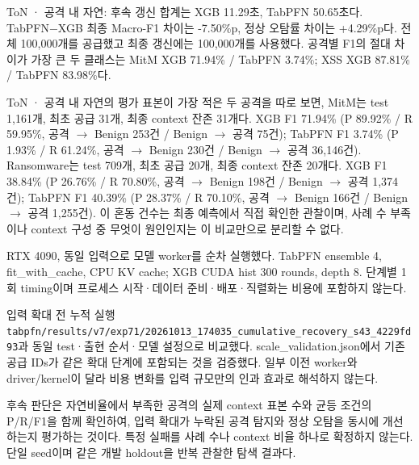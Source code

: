ToN · 공격 내 자연: 후속 갱신 합계는 XGB 11.29초, TabPFN 50.65초다. TabPFN−XGB 최종 Macro-F1 차이는 -7.50\%p, 정상 오탐률 차이는 +\allowbreak{}4.29\%p다. 전체 100,000개를 공급했고 최종 갱신에는 100,000개를 사용했다. 공격별 F1의 절대 차이가 가장 큰 두 클래스는 MitM XGB 71.94\% /\allowbreak{} TabPFN 3.74\%; XSS XGB 87.81\% /\allowbreak{} TabPFN 83.98\%다.

ToN · 공격 내 자연의 평가 표본이 가장 적은 두 공격을 따로 보면, MitM는 test 1,161개, 최초 공급 31개, 최종 context 잔존 31개다. XGB F1 71.94\% (P 89.92\% /\allowbreak{} R 59.95\%, 공격 \ensuremath{\rightarrow} Benign 253건 /\allowbreak{} Benign \ensuremath{\rightarrow} 공격 75건); TabPFN F1 3.74\% (P 1.93\% /\allowbreak{} R 61.24\%, 공격 \ensuremath{\rightarrow} Benign 230건 /\allowbreak{} Benign \ensuremath{\rightarrow} 공격 36,146건). Ransomware는 test 709개, 최초 공급 20개, 최종 context 잔존 20개다. XGB F1 38.84\% (P 26.76\% /\allowbreak{} R 70.80\%, 공격 \ensuremath{\rightarrow} Benign 198건 /\allowbreak{} Benign \ensuremath{\rightarrow} 공격 1,374건); TabPFN F1 40.39\% (P 28.37\% /\allowbreak{} R 70.10\%, 공격 \ensuremath{\rightarrow} Benign 166건 /\allowbreak{} Benign \ensuremath{\rightarrow} 공격 1,255건). 이 혼동 건수는 최종 예측에서 직접 확인한 관찰이며, 사례 수 부족이나 context 구성 중 무엇이 원인인지는 이 비교만으로 분리할 수 없다.

RTX 4090, 동일 입력으로 모델 worker를 순차 실행했다. TabPFN ensemble 4, fit\_\allowbreak{}with\_\allowbreak{}cache, CPU KV cache; XGB CUDA hist 300 rounds, depth 8. 단계별 1회 timing이며 프로세스 시작·데이터 준비·배포·직렬화는 비용에 포함하지 않는다.

입력 확대 전 누적 실행 \texttt{tabpfn/\allowbreak{}\allowbreak{}r\allowbreak{}esults/\allowbreak{}\allowbreak{}v\allowbreak{}7/\allowbreak{}\allowbreak{}exp71/\allowbreak{}\allowbreak{}20261013\allowbreak{}\_\allowbreak{}\allowbreak{}174035\_\allowbreak{}\allowbreak{}cumulati\allowbreak{}ve\_\allowbreak{}\allowbreak{}recov\allowbreak{}ery\_\allowbreak{}\allowbreak{}s43\_\allowbreak{}\allowbreak{}4229fd93\allowbreak{}}과 동일 test·출현 순서·모델 설정으로 비교했다. scale\_\allowbreak{}validation.json에서 기존 공급 IDs가 같은 확대 단계에 포함되는 것을 검증했다. 일부 이전 worker와 driver/\allowbreak{}kernel이 달라 비용 변화를 입력 규모만의 인과 효과로 해석하지 않는다.

후속 판단은 자연비율에서 부족한 공격의 실제 context 표본 수와 균등 조건의 P/\allowbreak{}R/\allowbreak{}F1을 함께 확인하여, 입력 확대가 누락된 공격 탐지와 정상 오탐을 동시에 개선하는지 평가하는 것이다. 특정 실패를 사례 수나 context 비율 하나로 확정하지 않는다. 단일 seed이며 같은 개발 holdout을 반복 관찰한 탐색 결과다.


